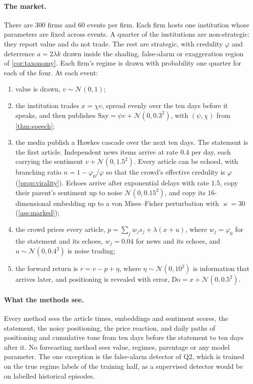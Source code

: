 \documentclass[11pt,a4paper]{article}
\theoremstyle{plain}
\theoremstyle{definition}
\theoremstyle{remark}
\newcommand{\N}{\mathcal{N}}
\begin{document}
\paragraph{The market.} There are $300$ firms and $60$ events per firm. Each firm hosts one institution whose parameters are fixed across events. A quarter of the institutions are non-strategic: they report value and do not trade. The rest are strategic, with credulity $\varphi$ and deterrence $a=2\lambda k$ drawn inside the shading, false-alarm or exaggeration region of \cref{cor:taxonomy}. Each firm's regime is drawn with probability one quarter for each of the four. At each event:
\begin{enumerate}[label=(\arabic*)]
  \item value is drawn, $v\sim\N(0,1)$;
  \item the institution trades $x=\chi v$, spread evenly over the ten days before it speaks, and then publishes $\text{Say}=\psi v+\N(0,0.3^2)$, with $(\psi,\chi)$ from \cref{thm:speech};
  \item the media publish a Hawkes cascade over the next ten days. The statement is the first article. Independent news items arrive at rate $0.4$ per day, each carrying the sentiment $v+\N(0,1.5^2)$. Every article can be echoed, with branching ratio $n=1-\varphi_0/\varphi$ so that the crowd's effective credulity is $\varphi$ (\cref{prop:virality}). Echoes arrive after exponential delays with rate $1.5$, copy their parent's sentiment up to noise $\N(0,0.15^2)$, and copy its $16$-dimensional embedding up to a von Mises--Fisher perturbation with $\varkappa=30$ (\cref{ass:marked});
  \item the crowd prices every article, $p=\sum_j w_j s_j+\lambda(x+u)$, where $w_j=\varphi_0$ for the statement and its echoes, $w_j=0.04$ for news and its echoes, and $u\sim\N(0,0.4^2)$ is noise trading;
  \item the forward return is $r=v-p+\eta$, where $\eta\sim\N(0,10^2)$ is information that arrives later, and positioning is revealed with error, $\text{Do}=x+\N(0,0.5^2)$.
\end{enumerate}

\paragraph{What the methods see.} Every method sees the article times, embeddings and sentiment scores, the statement, the noisy positioning, the price reaction, and daily paths of positioning and cumulative tone from ten days before the statement to ten days after it. No forecasting method sees value, regimes, parentage or any model parameter. The one exception is the false-alarm detector of Q2, which is trained on the true regime labels of the training half, as a supervised detector would be on labelled historical episodes.
\end{document}
